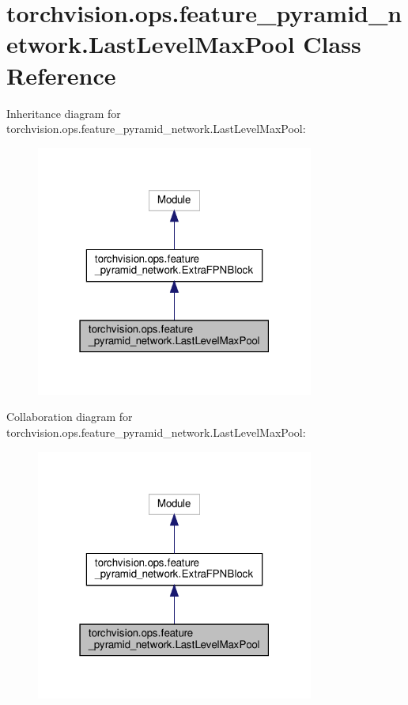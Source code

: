 \hypertarget{classtorchvision_1_1ops_1_1feature__pyramid__network_1_1LastLevelMaxPool}{}\section{torchvision.\+ops.\+feature\+\_\+pyramid\+\_\+network.\+Last\+Level\+Max\+Pool Class Reference}
\label{classtorchvision_1_1ops_1_1feature__pyramid__network_1_1LastLevelMaxPool}


Inheritance diagram for torchvision.\+ops.\+feature\+\_\+pyramid\+\_\+network.\+Last\+Level\+Max\+Pool\+:
\nopagebreak
\begin{figure}[H]
\begin{center}
\leavevmode
\includegraphics[width=259pt]{classtorchvision_1_1ops_1_1feature__pyramid__network_1_1LastLevelMaxPool__inherit__graph}
\end{center}
\end{figure}


Collaboration diagram for torchvision.\+ops.\+feature\+\_\+pyramid\+\_\+network.\+Last\+Level\+Max\+Pool\+:
\nopagebreak
\begin{figure}[H]
\begin{center}
\leavevmode
\includegraphics[width=259pt]{classtorchvision_1_1ops_1_1feature__pyramid__network_1_1LastLevelMaxPool__coll__graph}
\end{center}
\end{figure}
